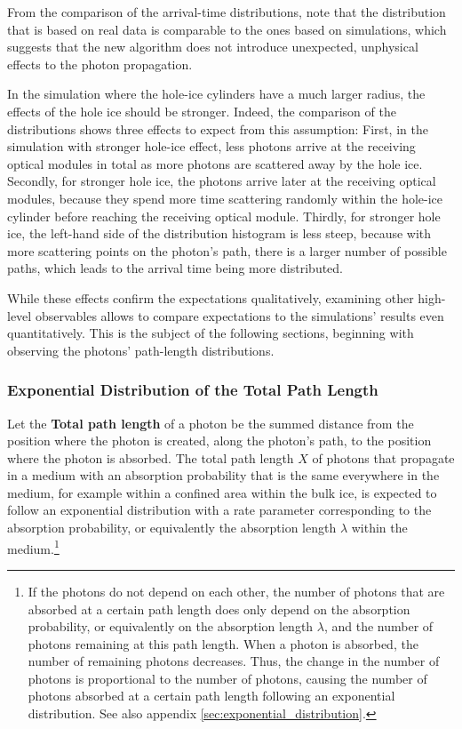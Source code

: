 From the comparison of the arrival-time distributions, note that the distribution that is based on real data is comparable to the ones based on simulations, which suggests that the new algorithm does not introduce unexpected, unphysical effects to the photon propagation.


In the simulation where the hole-ice cylinders have a much larger radius, the effects of the hole ice should be stronger. Indeed, the comparison of the distributions shows three effects to expect from this assumption:
First, in the simulation with stronger hole-ice effect, less photons arrive at the receiving optical modules in total as more photons are scattered away by the hole ice.
Secondly, for stronger hole ice, the photons arrive later at the receiving optical modules, because they spend more time scattering randomly within the hole-ice cylinder before reaching the receiving optical module.
Thirdly, for stronger hole ice, the left-hand side of the distribution histogram is less steep, because with more scattering points on the photon's path, there is a larger number of possible paths, which leads to the arrival time being more distributed.

While these effects confirm the expectations qualitatively, examining other high-level observables allows to compare expectations to the simulations' results even quantitatively. This is the subject of the following sections, beginning with observing the photons' path-length distributions.


\subsubsection{Exponential Distribution of the Total Path Length}
\label{sec:total_path_length_distribution}


Let the \textbf{Total path length} of a photon be the summed distance from the position where the photon is created, along the photon's path, to the position where the photon is absorbed.
The total path length $X$ of photons that propagate in a medium with an absorption probability that is the same everywhere in the medium, for example within a confined area within the bulk ice, is expected to follow an exponential distribution with a rate parameter corresponding to the absorption probability, or equivalently the absorption length $\lambda$ within the medium.\footnote{If the photons do not depend on each other, the number of photons that are absorbed at a certain path length does only depend on the absorption probability, or equivalently on the absorption length $\lambda$, and the number of photons remaining at this path length. When a photon is absorbed, the number of remaining photons decreases. Thus, the change in the number of photons is proportional to the number of photons, causing the number of photons absorbed at a certain path length following an exponential distribution. See also appendix \ref{sec:exponential_distribution}.}


